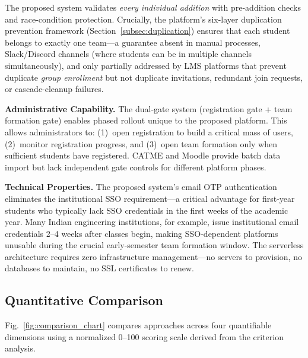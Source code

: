 \documentclass[conference]{IEEEtran}
\begin{document}
The proposed system validates \textit{every individual addition} with pre-addition checks and race-condition protection. Crucially, the platform's six-layer duplication prevention framework (Section~\ref{subsec:duplication}) ensures that each student belongs to exactly one team---a guarantee absent in manual processes, Slack/Discord channels (where students can be in multiple channels simultaneously), and only partially addressed by LMS platforms that prevent duplicate \textit{group enrollment} but not duplicate invitations, redundant join requests, or cascade-cleanup failures.

\textbf{Administrative Capability.} The dual-gate system (registration gate + team formation gate) enables phased rollout unique to the proposed platform. This allows administrators to: (1)~open registration to build a critical mass of users, (2)~monitor registration progress, and (3)~open team formation only when sufficient students have registered. CATME and Moodle provide batch data import but lack independent gate controls for different platform phases.

\textbf{Technical Properties.} The proposed system's email OTP authentication eliminates the institutional SSO requirement---a critical advantage for first-year students who typically lack SSO credentials in the first weeks of the academic year. Many Indian engineering institutions, for example, issue institutional email credentials 2--4 weeks after classes begin, making SSO-dependent platforms unusable during the crucial early-semester team formation window. The serverless architecture requires zero infrastructure management---no servers to provision, no databases to maintain, no SSL certificates to renew.

\subsection{Quantitative Comparison}

Fig.~\ref{fig:comparison_chart} compares approaches across four quantifiable dimensions using a normalized 0--100 scoring scale derived from the criterion analysis.
\end{document}
